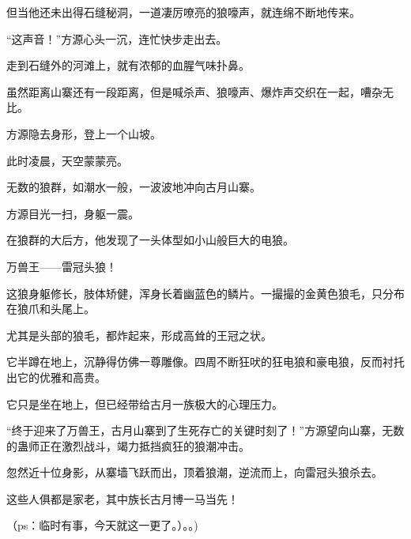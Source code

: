 \begin{this_body}
但当他还未出得石缝秘洞，一道凄厉嘹亮的狼嚎声，就连绵不断地传来。

“这声音！”方源心头一沉，连忙快步走出去。

走到石缝外的河滩上，就有浓郁的血腥气味扑鼻。

虽然距离山寨还有一段距离，但是喊杀声、狼嚎声、爆炸声交织在一起，嘈杂无比。

方源隐去身形，登上一个山坡。

此时凌晨，天空蒙蒙亮。

无数的狼群，如潮水一般，一波波地冲向古月山寨。

方源目光一扫，身躯一震。

在狼群的大后方，他发现了一头体型如小山般巨大的电狼。

万兽王——雷冠头狼！

这狼身躯修长，肢体矫健，浑身长着幽蓝色的鳞片。一撮撮的金黄色狼毛，只分布在狼爪和头尾上。

尤其是头部的狼毛，都炸起来，形成高耸的王冠之状。

它半蹲在地上，沉静得仿佛一尊雕像。四周不断狂吠的狂电狼和豪电狼，反而衬托出它的优雅和高贵。

它只是坐在地上，但已经带给古月一族极大的心理压力。

“终于迎来了万兽王，古月山寨到了生死存亡的关键时刻了！”方源望向山寨，无数的蛊师正在激烈战斗，竭力抵挡疯狂的狼潮冲击。

忽然近十位身影，从寨墙飞跃而出，顶着狼潮，逆流而上，向雷冠头狼杀去。

这些人俱都是家老，其中族长古月博一马当先！

（ps：临时有事，今天就这一更了。）。。)

\end{this_body}

